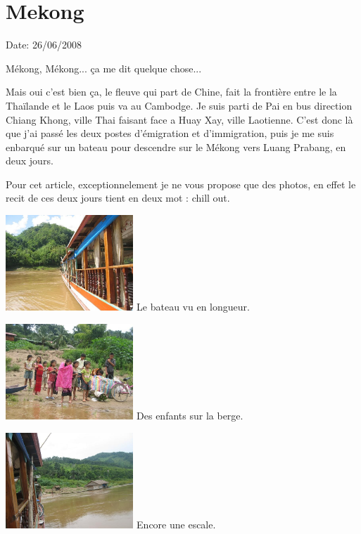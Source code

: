 \section{Mekong}

Date: 26/06/2008

\begin{multicols}{2}

Mékong, Mékong... ça me dit quelque chose...

Mais oui c'est bien ça, le fleuve qui part de Chine, fait la frontière entre le la Thaïlande et le Laos puis va au Cambodge. Je suis parti de Pai en bus direction Chiang Khong, ville Thai faisant face a Huay Xay, ville Laotienne. C'est donc là que j'ai passé les deux postes d'émigration et d'immigration, puis je me suis enbarqué sur un bateau pour descendre sur le Mékong vers Luang Prabang, en deux jours.

Pour cet article, exceptionnelement je ne vous propose que des photos, en effet le recit de ces deux jours tient en deux mot : chill out.

\hspace*{-0.65cm}
\includegraphics[width=4.8cm]{articles/Mekong/1214473370zy1a.jpg}
Le bateau vu en longueur.

\hspace*{-0.65cm}
\includegraphics[width=4.8cm]{articles/Mekong/12144733896AMi.jpg}
Des enfants sur la berge.

\hspace*{-0.65cm}
\includegraphics[width=4.8cm]{articles/Mekong/1214473395mtro.jpg}
Encore une escale.


\end{multicols}
